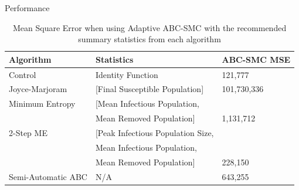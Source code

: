 \documentclass[aspectratio=169]{beamer}
\begin{document}
\begin{frame}{Performance}
  \begin{table}
    \begin{tabular}{|l|l|l|}
      \hline
      \textbf{Algorithm}&\textbf{Statistics}&\textbf{ABC-SMC MSE}\\
      \hline \hline
      Control&Identity Function&121,777\\\hline
      Joyce-Marjoram&[Final Susceptible Population]&101,730,336\\\hline
      Minimum Entropy&[Mean Infectious Population,&\\
      &Mean Removed Population]&1,131,712\\\hline
      2-Step ME&[Peak Infectious Population Size,&\\
      &Mean Infectious Population,&\\
      &Mean Removed Population]&228,150\\\hline
      Semi-Automatic ABC&N/A&643,255\\\hline
    \end{tabular}
    \caption{Mean Square Error when using Adaptive ABC-SMC with the recommended summary statistics from each algorithm}
  \end{table}
\end{frame}
\end{document}
